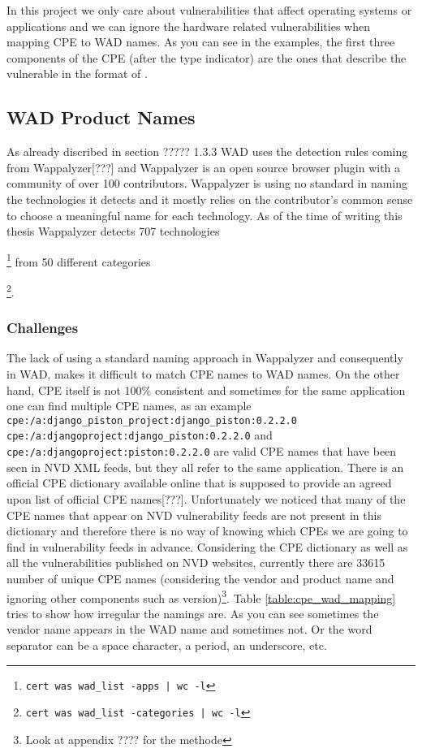 In this project we only care about vulnerabilities that affect operating systems or applications and we can ignore the hardware related vulnerabilities when mapping CPE to WAD names. As you can see in the examples, the first three components of the CPE (after the type indicator) are the ones that describe the vulnerable in the format of .
 

\subsection{WAD Product Names}

As already discribed in section ????? 1.3.3 WAD uses the detection rules coming from Wappalyzer[???] and Wappalyzer is an open source browser plugin with a community of over 100 contributors. Wappalyzer is using no standard in naming the technologies it detects and it mostly relies on the contributor's common sense to choose a meaningful name for each technology. As of the time of writing this thesis Wappalyzer detects 707 technologies{\footnote{\texttt{cert was wad\_list -apps | wc -l}} from 50 different categories{\footnote{\texttt{cert was wad\_list -categories | wc -l}}. 
\subsubsection{Challenges}
The lack of using a standard naming approach in Wappalyzer and consequently in WAD, makes it difficult to match CPE names to WAD names. On the other hand, CPE itself is not 100\% consistent and sometimes for the same application one can find multiple CPE names, as an example \texttt{cpe:/a:django\_piston\_project:django\_piston:0.2.2.0} \texttt{cpe:/a:djangoproject:django\_piston:0.2.2.0} and \texttt{cpe:/a:djangoproject:piston:0.2.2.0} are valid CPE names that have been seen in NVD XML feeds, but they all refer to the same application.
There is an official CPE dictionary available online that is supposed to provide an agreed upon list of official CPE names[???]. Unfortunately we noticed that many of the CPE names that appear on NVD vulnerability feeds are not present in this dictionary and therefore there is no way of knowing which CPEs we are going to find in vulnerability feeds in advance. Considering the CPE dictionary as well as all the vulnerabilities published on NVD websites, currently there are 33615 number of unique CPE names (considering the vendor and product name and ignoring other components such as version)\footnote{Look at appendix ???? for the methode}. Table \ref{table:cpe_wad_mapping} tries to show how irregular the namings are. As you can see sometimes the vendor name appears in the WAD name and sometimes not. Or the word separator can be a space character, a period, an underscore, etc. 

}}
